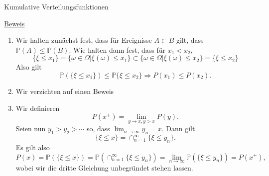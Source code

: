 \documentclass[
  8pt,
  ignorenonframetext,
]{beamer}
\begin{document}
\begin{frame}{Kumulative Verteilungsfunktionen}
\protect\hypertarget{kumulative-verteilungsfunktionen-4}{}
\footnotesize

\underline{Beweis} \vspace{2mm}

\begin{enumerate}
[(1)]
\item
  Wir halten zunächst fest, dass für Ereignisse \(A \subset B\) gilt,
  dass \(\mathbb{P}(A)\le \mathbb{P}(B)\). Wie halten dann fest, dass
  für \(x_1 < x_2\), \begin{equation}
  \{\xi \le x_1\} =
  \{\omega \in \Omega|\xi(\omega)\le x_1\} \subset
  \{\omega \in \Omega|\xi(\omega)\le x_2\} =
  \{\xi \le x_2\}
  \end{equation} Also gilt \begin{equation}
  \mathbb{P}(\{\xi \le x_1\})
  \le
  \mathbb{P}\{\xi \le x_2\}
  \Rightarrow P(x_1) \le P(x_2).
  \end{equation}
\item
  Wir verzichten auf einen Beweis \vspace{2mm}
\item
  Wir definieren \begin{equation}
  P(x^+) = \lim_{y \to x, y > x} P(y).
  \end{equation} Seien nun \(y_1 > y_2 > \cdots\) so, dass
  \(\lim_{n \to \infty}y_n = x\). Dann gilt \begin{equation}
  \{\xi \le x\} = \cap_{n = 1}^\infty \{\xi \le y_n\}.
  \end{equation} Es gilt also \begin{equation}
  P(x)
  = \mathbb{P}(\{\xi \le x\})
  = \mathbb{P}(\cap_{n = 1}^\infty \{\xi \le y_n\})
  = \lim_{n\to \infty}\mathbb{P}(\{\xi \le y_n\})
  = P(x^+),
  \end{equation} wobei wir die dritte Gleichung unbegründet stehen
  lassen.
\end{enumerate}
\end{frame}
\end{document}
